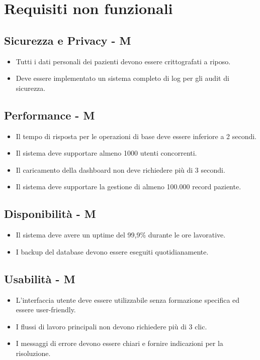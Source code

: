 \documentclass[12pt,a4paper,oneside]{report}
\begin{document}
\section{Requisiti non funzionali}

\subsection{Sicurezza e Privacy - M}

\begin{itemize}
    \item Tutti i dati personali dei pazienti devono essere crittografati a riposo.
    \item Deve essere implementato un sistema completo di log per gli audit di sicurezza.
\end{itemize}

\subsection{Performance  - M}

\begin{itemize}
    \item Il tempo di risposta per le operazioni di base deve essere inferiore a 2 secondi.
    \item Il sistema deve supportare almeno 1000 utenti concorrenti.
    \item Il caricamento della dashboard non deve richiedere più di 3 secondi.
    \item Il sistema deve supportare la gestione di almeno 100.000 record paziente.
\end{itemize}

\subsection{Disponibilità  - M}

\begin{itemize}
    \item Il sistema deve avere un uptime del 99,9\% durante le ore lavorative.
    \item I backup del database devono essere eseguiti quotidianamente.
\end{itemize}

\subsection{Usabilità  - M}

\begin{itemize}
    \item L'interfaccia utente deve essere utilizzabile senza formazione specifica ed essere user-friendly.
    \item I flussi di lavoro principali non devono richiedere più di 3 clic.
    \item I messaggi di errore devono essere chiari e fornire indicazioni per la risoluzione.
\end{itemize}
\end{document}
